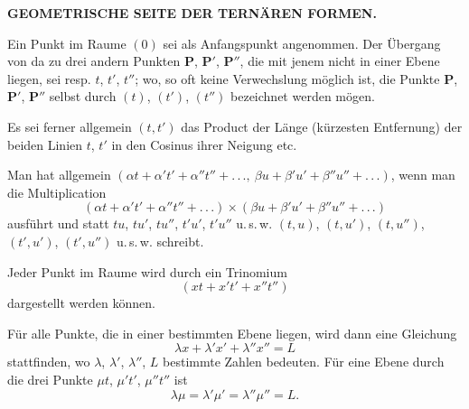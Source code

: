 
\begin{center}
\large\bfseries GEOMETRISCHE SEITE DER TERNÄREN FORMEN.
\end{center}



Ein Punkt im Raume $(0)$ sei als Anfangspunkt angenommen. Der Übergang von da zu drei
andern Punkten $\boldsymbol{P}$, $\boldsymbol{P}'$, $\boldsymbol{P}''$, die mit jenem nicht
in einer Ebene liegen, sei resp. $t$, $t'$, $t''$; wo, so oft keine Verwechslung möglich
ist, die Punkte $\boldsymbol{P}$, $\boldsymbol{P}'$, $\boldsymbol{P}''$ selbst durch $(t)$,
$(t')$, $(t'')$ bezeichnet werden mögen.

Es sei ferner allgemein $(t,t')$ das Product der Länge (kürzesten Entfernung) der beiden
Linien $t$, $t'$ in den Cosinus ihrer Neigung etc.

Man hat allgemein $(\alpha t + \alpha' t' + \alpha'' t'' + .\,.\,.,\ \beta u + \beta' u' +
\beta'' u'' + .\,.\,.)$, wenn man die Multiplication
\[
(\alpha t + \alpha' t' + \alpha'' t'' + .\,.\,.) \times (\beta u + \beta' u' + \beta'' u'' + .\,.\,.)
\]
ausführt und statt $tu$, $tu'$, $tu''$, $t'u'$, $t'u''$ u.\,s.\,w. $(t,u)$, $(t,u')$,
$(t,u'')$, $(t',u')$, $(t',u'')$ u.\,s.\,w. schreibt.

Jeder Punkt im Raume wird durch ein Trinomium
\[
(xt + x't' + x''t'')
\]
dargestellt werden können.

Für alle Punkte, die in einer bestimmten Ebene liegen, wird dann eine Gleichung
\[
\lambda x + \lambda' x' + \lambda'' x'' = L
\]
stattfinden, wo $\lambda$, $\lambda'$, $\lambda''$, $L$ bestimmte Zahlen bedeuten. Für eine
Ebene durch die drei Punkte $\mu t$, $\mu' t'$, $\mu'' t''$ ist
\[
\lambda\mu = \lambda'\mu' = \lambda''\mu'' = L.
\]
